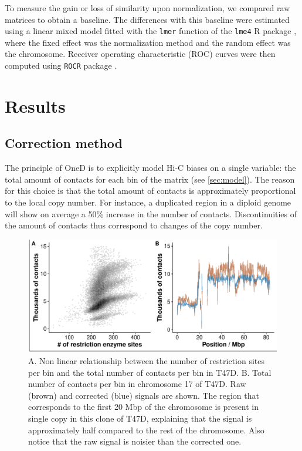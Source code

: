 \documentclass{bioinfo}
\begin{document}
\begin{methods}
To measure the gain or loss of similarity upon normalization, we compared
raw matrices to obtain a baseline. The differences with this baseline were
estimated using a linear mixed model fitted with the \texttt{lmer}
function of the \texttt{lme4} R package \citep{bates2015lme4}, where the
fixed effect was the normalization method and the random effect was the
chromosome. Receiver operating characteristic (ROC) curves were then
computed using \texttt{ROCR} package \citep{sing2005rocr}.


\end{methods}





\section{Results}

\subsection{Correction method}

The principle of OneD is to explicitly model Hi-C biases on a single
variable: the total amount of contacts for each bin of the matrix (see
\ref{sec:model}). The reason for this choice is that the total amount of
contacts is approximately proportional to the local copy number. For
instance, a duplicated region in a diploid genome will show on average a
50\% increase in the number of contacts. Discontinuities of the amount of
contacts thus correspond to changes of the copy number.

\begin{figure}[!tp]
\centerline{\includegraphics[width=.45\textwidth]{img/figure1.pdf}}
\caption{A. Non linear relationship between the number of restriction
sites per bin and the total number of contacts per bin in T47D. B. Total
number of contacts per bin in chromosome 17 of T47D. Raw (brown) and
corrected (blue) signals are shown. The region that corresponds to the
first 20 Mbp of the chromosome is present in single copy in this clone of
T47D, explaining that the signal is approximately half compared to the
rest of the chromosome.  Also notice that the raw signal is noisier than
the corrected one.}
\label{fig:totals}
\end{figure}
\end{document}
